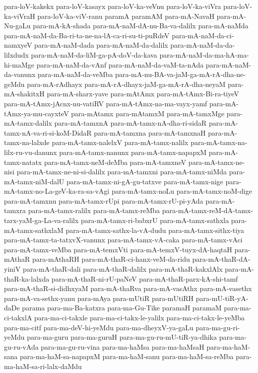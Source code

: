 {para-loV-kakekx
para-loV-kasayx
para-loV-ka-veVnu
para-loV-ka-viVra
para-loV-ka-viVraH
para-loV-ka-viV-ranu
paramA
paramAM
para-mA-NavaH
para-mA-Nu-gaLu
para-mA-kA-shada
para-mA-naM-dA-nu-Ba-va-dalilx
para-mA-naMda
para-mA-naM-da-Ba-ri-ta-ne-na-lA-ca-ri-su-ti-puRdeV
para-mA-naM-da-ci-namxyeV
para-mA-naM-dada
para-mA-naM-da-dalilx
para-mA-naM-da-da-lilxdudx
para-mA-naM-da-liM-ga-pA-doV-da-kava
para-mA-naM-da-ma-hA-ma-hi-maMge
para-mA-naM-da-vAnf
para-mA-naM-da-vaM-ta-nAda
para-mA-naM-da-vanunx
para-mA-naM-da-veMba
para-mA-nu-BA-va-jaM-ga-mA-rA-dha-ne-geMdu
para-mA-rAdhayx
para-mA-rA-dhayx-jaM-ga-mA-rA-dha-neyaM
para-mA-shakitxH
para-mA-sharx-yave
para-mAtAmx
para-mA-tAmx-Bi-ra-tiyeV
para-mA-tAmx-jAcnx-nu-vatiRV
para-mA-tAmx-na-ma-vayx-yamf
para-mA-tAmx-ya-mu-cayxteV
para-mAtamx
para-mAtamxM
para-mA-tamxMge
para-mA-tamx-dalilx
para-mA-tamxnA
para-mA-tamx-nA-dha-ri-sidaR
para-mA-tamx-nA-va-ri-si-koM-DidaR
para-mA-tamxna
para-mA-tamxnaH
para-mA-tamx-na-lalxde
para-mA-tamx-nalelxV
para-mA-tamx-nalilx
para-mA-tamx-na-lilx-ru-vu-danunx
para-mA-tamx-nanunx
para-mA-tamx-napapxM
para-mA-tamx-natatx
para-mA-tamx-neM-deMba
para-mA-tamxneV
para-mA-tamx-ne-nisi
para-mA-tamx-ne-ni-si-dalilx
para-mA-tamxni
para-mA-tamx-niMda
para-mA-tamx-niM-dalU
para-mA-tamx-ni-gA-gu-tatxve
para-mA-tamx-nige
para-mA-tamx-no-La-geV-ka-ra-sa-vAgi
para-mA-tamx-noLu
para-mA-tamx-noM-dige
para-mA-tamxnu
para-mA-tamx-rUpi
para-mA-tamx-rU-pi-yAda
para-mA-tamxra
para-mA-tamx-ralilx
para-mA-tamx-reMba
para-mA-tamx-reM-dA-tamx-tarx-yaM-ga-La-va-ralilx
para-mA-tamx-ri-babxrU
para-mA-tamx-sathxla
para-mA-tamx-sathxlaM
para-mA-tamx-sathx-la-vA-dudu
para-mA-tamx-sithx-tiya
para-mA-tamx-ta-tatxvX-vanunx
para-mA-tamx-vA-caka
para-mA-tamx-vAci
para-mA-tamx-veMba
para-mA-temxVti
para-mA-temxV-tuyx-dA-haqtaH
para-mAthaR
para-mAthaRH
para-mA-thaR-ci-hanx-veM-da-ridu
para-mA-thaR-dA-yiniV
para-mA-thaR-dali
para-mA-thaR-dalilx
para-mA-thaR-kakxlAlx
para-mA-thaR-ka-lalxda
para-mA-thaR-ni-rU-paNeV
para-mA-thaR-parx-kA-shi-tamf
para-mA-thaR-si-didhxyaM
para-mA-thaRva
para-mA-vasAthx
para-mA-vasethx
para-mA-va-sethx-yanu
para-mAya
para-mUtiR
para-mUtiRH
para-mU-tiR-yA-daDe
parama
para-ma-Ba-katxra
para-ma-Gu-Tike
paramaH
paramaM
para-ma-ci-takxlA
para-ma-ci-takxle
para-ma-ci-takx-le-yalilx
para-ma-ci-takx-le-yeMba
para-ma-citf
para-ma-deV-hi-yeMdu
para-ma-dheyxV-ya-gaLu
para-ma-gu-ri-yeMdu
para-ma-guru
para-ma-guruH
para-ma-gu-ru-mU-tiR-ya-dhika
para-ma-gu-ru-vAda
para-ma-gu-ru-vina
para-ma-haMsa
para-ma-haMsaH
para-ma-haM-sana
para-ma-haM-sa-napapxM
para-ma-haM-sanu
para-ma-haM-sa-reMba
para-ma-haM-sa-ri-lalx-daMdu
}
